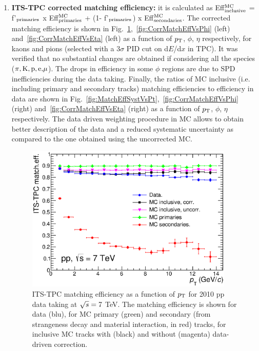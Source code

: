 \begin{enumerate}
\item {\bf ITS-TPC corrected matching efficiency:} it is calculated 
as  Eff$^{\rm MC}_{\rm inclusive}$ = f'$_{\rm primaries}$ x Eff$^{\rm MC}_{\rm primaries}$ + (1- f'$_{\rm primaries}$) x Eff$^{\rm MC}_{\rm secondaries}$. The corrected matching efficiency 
is shown in Fig.~\ref{fig:CorrMatchEffVsPt},~\ref{fig:CorrMatchEffVsPhi} 
(left) and~\ref{fig:CorrMatchEffVsEta} (left)
as a function of $p_{\rm T}$, $\phi$, $\eta$ respectively, for kaons and 
pions (selected with a 3$\sigma$ PID cut on d$E$/d$x$ in TPC). 
It was verified that no substantial changes are obtained if 
considering all the species ($\pi, {\rm K, p, e,} \mu$). 
The drops in efficiency in some $\phi$ regions are due to SPD
inefficiencies during the data taking.
Finally, the ratios of MC inclusive (i.e. including primary and secondary tracks) matching efficiencies to
efficiency in data are shown in Fig.~\ref{fig:MatchEffSystVsPt},~\ref{fig:CorrMatchEffVsPhi} 
(right) and~\ref{fig:CorrMatchEffVsEta} (right) as a function of 
$p_{\rm T}$, $\phi$, $\eta$ respectively. The data driven weighting procedure 
in MC allows to obtain better description of the data and a reduced systematic uncertainty
as compared to the one obtained using the uncorrected MC.
\begin{figure}[!htb]
\begin{center}
\includegraphics[height=7cm]{FigCap4/ITSTPCmatchEff_10bpass4_vsPt.eps}
\caption{ITS-TPC matching efficiency as a function of $p_{\rm T}$ for 2010 pp data taking at $\sqrt{s} = 7$ TeV. The matching efficiency is shown for data (blu), for MC primary (green) and secondary (from strangeness decay and material interaction, in red) tracks, for inclusive MC tracks with (black) and without (magenta) data-driven correction. }
\label{fig:CorrMatchEffVsPt}
\end{center}
\end{figure}
\begin{figure}[!htb]

\end{figure}
\end{enumerate}
